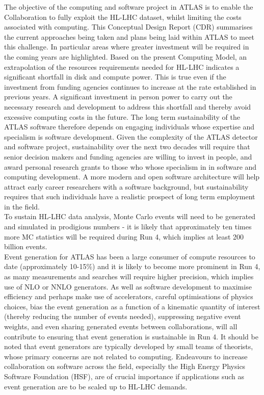 \label{sec:overview}
The objective of the computing and software project in ATLAS is to enable the Collaboration to fully exploit the HL-LHC dataset, whilst limiting the costs associated with computing. This Conceptual Design Report (CDR) summarises the current approaches being taken and plans being laid within ATLAS to meet this challenge. In particular areas where greater investment will be required in the coming years are highlighted. Based on the present Computing Model, an extrapolation of the resources requirements needed for HL-LHC indicates a significant shortfall in disk and compute power. This is true even if the investment from funding agencies continues to increase at the rate established in  previous years. A significant investment in person power to carry out the necessary research and development to address this shortfall and thereby avoid excessive computing costs in the future. The long term sustainability of the ATLAS software therefore depends on engaging individuals whose expertise and specialism is software development. Given the complexity of the ATLAS detector and software project, sustainability over the next two decades will require that senior decision makers and funding agencies are willing to invest in people, and award personal research grants to those who whose specialism in in software and computing development. A more modern and open software architecture will help attract early career researchers with a software background, but sustainability requires that such individuals have a realistic prospect of long term employment in the field. \\
 
To sustain HL-LHC data analysis, Monte Carlo events will need to be generated and simulated in prodigious numbers - it is likely that approximately ten times more MC statistics will be required during Run 4, which implies at least 200 billion events. \\

Event generation for ATLAS has been a large consumer of compute resources to date (approximately 10-15\%) and it is likely to become more prominent in Run 4, as many measurements and searches will require higher precision, which implies use of NLO or NNLO generators. As well as software development to maximise efficiency and perhaps make use of accelerators, careful optimisations of physics choices, bias the event generation as a function of a kinematic quantity of interest (thereby reducing the number of events needed), suppressing negative event weights, and even sharing generated events between collaborations, will all contribute to ensuring that event generation is sustainable in Run 4. It should be noted that event generators are typically developed by small teams of theorists, whose primary concerns are not related to computing. Endeavours to increase collaboration on software across the field, especially the High Energy Physics Software Foundation (HSF), are of crucial importance if applications such as event generation are to be scaled up to HL-LHC demands. \\ 


